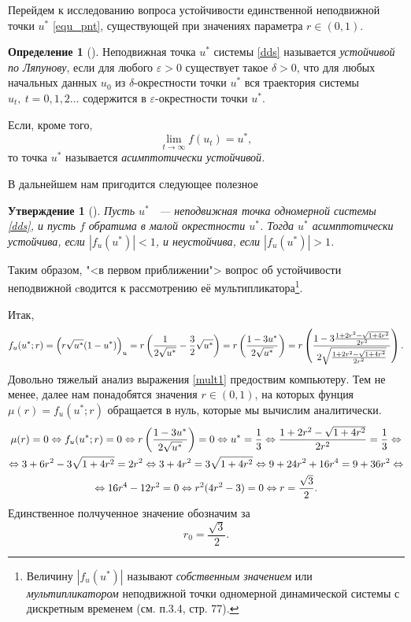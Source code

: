\documentclass[oneside,final,12pt]{article}
\renewcommand*\equiv{\Leftrightarrow}
\newcommand*\eps{\varepsilon}
\newcommand*\abs[1]{|#1|}
\newcommand*\inter[2]{(#1,#2)}
\theoremstyle{plain}
\theoremstyle{remark}
\theoremstyle{definition}
\newtheorem{definition}{Определение}
\theoremstyle{plain}
\newtheorem{statement}{Утверждение}
\begin{document}
		\bigskip \bigskip \bigskip

		Перейдем к исследованию вопроса устойчивости единственной неподвижной точки \(u^*\) \eqref{equ_pnt}, существующей при значениях параметра \( r \in \inter{0}{1} \).
		\begin{definition}[\cite{DSMB}]
			Неподвижная точка \(u^*\) системы \eqref{dds} называется \emph{устойчивой по Ляпунову}, если для любого \(\eps > 0\) существует такое \(\delta > 0\), что для любых начальных данных \(u_0\) из \(\delta\)-окрестности точки \(u^*\) вся траектория системы \(u_t, \: t = 0,1,2\ldots\) содержится в \(\eps\)-окрестности точки \(u^*\).

			Если, кроме того, \[\lim_{t \to \infty} f(u_t) = u^*,\] то точка \(u^*\) называется \emph{асимптотически устойчивой.}
		\end{definition}
		В дальнейшем нам пригодится следующее полезное
		\begin{statement}[\cite{DSMB}] \label{st1}
			Пусть \(u^*\)  ~--- неподвижная точка одномерной системы \eqref{dds}, и пусть \(f\) обратима в малой окрестности \(u^*\). Тогда \(u^*\) асимптотически устойчива, если \( \abs{f_u(u^*)} < 1 \), и неустойчива, если \( \abs{f_u(u^*)} > 1 \).
		\end{statement}
		Таким образом, "<в первом приближении"> вопрос об устойчивости неподвижной cводится к рассмотрению её мультипликатора\footnote{Величину \(\abs{f_u(u^*)}\) называют \emph{собственным значением} или \emph{мультипликатором} неподвижной точки одномерной динамической системы с дискретным временем (см. \cite{DSMB} п.3.4, стр. 77).}.
		
		Итак, 
		\begin{equation} \label{mult1}
			f_u(u^*;r) = \left( r\sqrt{u^*}(1-u^*) \right)_u = r \left( \frac{1}{2\sqrt{u^*}} - \frac{3}{2}\sqrt{u^*} \right) =  r \left( \frac{1-3u^*}{2\sqrt{u^*}} \right) = r \left( \frac{1-3\frac{1+2r^2 - \sqrt{1+4r^2}}{2r^2}}{2\sqrt{\frac{1+2r^2 - \sqrt{1+4r^2}}{2r^2}}} \right).
		\end{equation}
		Довольно тяжелый анализ выражения \eqref{mult1} предоствим компьютеру. Тем не менее, далее нам понадобятся значения  \(r \in \inter{0}{1}\), на которых фунция \( \mu(r) = f_u(u^*;r)\) обращается в нуль, которые мы вычислим аналитически.
		\begin{multline*}
			\mu(r) = 0 \equiv f_u(u^*;r) = 0 \equiv r \left( \frac{1-3u^*}{2\sqrt{u^*}} \right) = 0 \equiv u^* = \frac{1}{3} \equiv \ep = \frac{1}{3} \equiv \\ \equiv 3 + 6r^2 - 3\sqrt{1+4r^2} = 2r^2 \equiv 3 + 4r^2 = 3\sqrt{1+4r^2} \equiv  9+24r^2 + 16r^4 = 9 + 36r^2 \equiv \\ \equiv 16r^4 - 12r^2 = 0 \equiv r^2(4r^2-3) = 0 \equiv r = \frac{\sqrt{3}}{2}.
		\end{multline*}
		Единственное полчученное значение обозначим за
		\begin{equation} \label{r_0}
			r_0 = \frac{\sqrt{3}}{2}.
		\end{equation}
\end{document}
